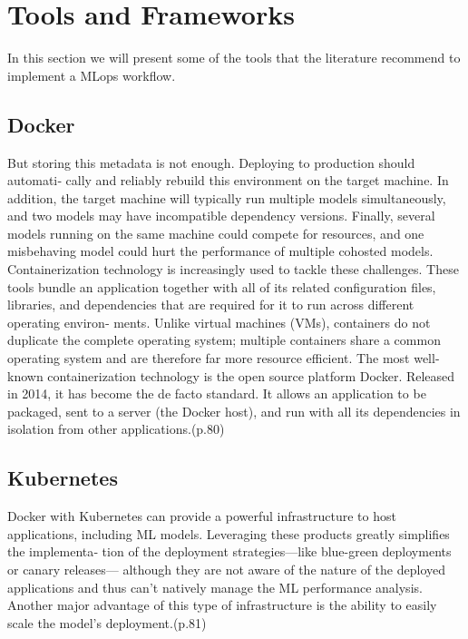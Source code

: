 \section{Tools and Frameworks}\label{sec:tools}

In this section we will present some of the tools that the literature recommend to implement a MLops workflow.

\subsection{Docker}
But storing this metadata is not enough. Deploying to production should automati‐
cally and reliably rebuild this environment on the target machine. In addition, the
target machine will typically run multiple models simultaneously, and two models
may have incompatible dependency versions. Finally, several models running on the
same machine could compete for resources, and one misbehaving model could hurt
the performance of multiple cohosted models.
Containerization technology is increasingly used to tackle these challenges. These
tools bundle an application together with all of its related configuration files, libraries,
and dependencies that are required for it to run across different operating environ‐
ments. Unlike virtual machines (VMs), containers do not duplicate the complete
operating system; multiple containers share a common operating system and are
therefore far more resource efficient.
The most well-known containerization technology is the open source platform
Docker. Released in 2014, it has become the de facto standard. It allows an application
to be packaged, sent to a server (the Docker host), and run with all its dependencies
in isolation from other applications.\cite{treveil2020introducing}(p.80)

\subsection{Kubernetes}

Docker with Kubernetes can provide a powerful infrastructure to host applications,
including ML models. Leveraging these products greatly simplifies the implementa‐
tion of the deployment strategies—like blue-green deployments or canary releases—
although they are not aware of the nature of the deployed applications and thus can’t
natively manage the ML performance analysis. Another major advantage of this type
of infrastructure is the ability to easily scale the model’s deployment.\cite{treveil2020introducing}(p.81)

